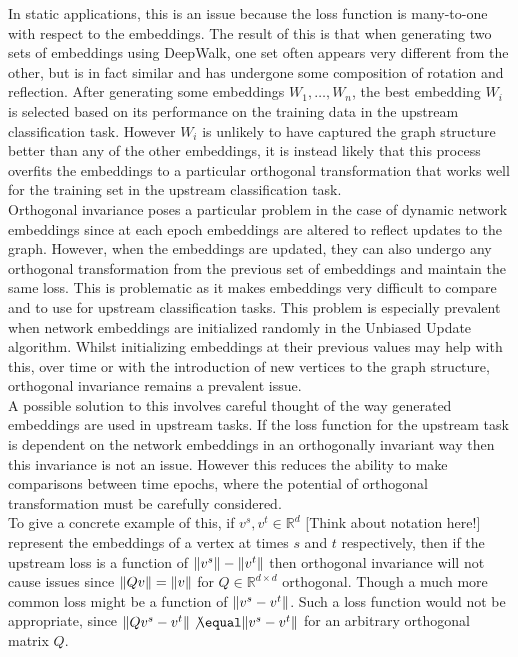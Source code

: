 \documentclass[a4paper]{article}
\begin{document}
In static applications, this is an issue because the loss function is many-to-one with respect to the embeddings. The result of this is that when generating two sets of 
embeddings using DeepWalk, one set often appears very different from the other, but is in fact similar and has undergone some composition of rotation and reflection. After generating 
some embeddings $W_1, \dots, W_n$, the best embedding $W_i$ is selected based on its performance on the training data in the upstream classification task. However $W_i$ is unlikely to have captured the graph structure
better than any of the other embeddings, it is instead likely that this process overfits the embeddings to a particular orthogonal transformation that works well for the training set in the upstream classification task.\\
Orthogonal invariance poses a particular problem in the case of dynamic network embeddings since at each epoch embeddings are altered to reflect
updates to the graph. However, when the embeddings are updated, they can also undergo any orthogonal transformation from the previous set of embeddings
and maintain the same loss. This is problematic as it makes embeddings very difficult to compare and to use for upstream classification tasks. This problem is especially
prevalent when network embeddings are initialized randomly in the Unbiased Update algorithm. Whilst initializing embeddings at their previous values may help with this,
over time or with the introduction of new vertices to the graph structure, orthogonal invariance remains a prevalent issue.\\
A possible solution to this involves careful thought of the way generated embeddings are used in upstream tasks. If the loss function for the upstream task
is dependent on the network embeddings in an orthogonally invariant way then this invariance is not an issue. However this reduces the ability to
make comparisons between time epochs, where the potential of orthogonal transformation must be carefully considered.\\
To give a concrete example of this,  if $v^s, v^t \in \mathbb{R}^d$ [Think about notation here!] represent the embeddings of a vertex at times $s$ and $t$ respectively, then
if the upstream loss is a function of $\lVert v^s\rVert-\lVert v^t\rVert$ then orthogonal invariance will not cause issues since $\lVert Qv\rVert = \lVert v\rVert$ for $Q \in \mathbb{R}^{d \times d}$ orthogonal.
Though a much more common loss might be a function of $\lVert v^s - v^t\rVert$. Such a loss function would not be appropriate, since $\norm{Qv^s - v^t} \not\equal \norm{v^s - v^t}$ for an arbitrary
orthogonal matrix $Q$.
\end{document}
